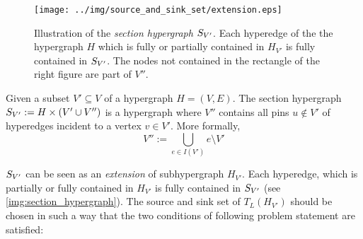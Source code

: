 \begin{figure}
\centering
\texttt{[image: ../img/source\_and\_sink\_set/extension.eps]}
\caption{Illustration of the \emph{section hypergraph} $S_{V'}$. Each hyperedge of the
         the hypergraph $H$ which is fully or partially contained in $H_{V'}$ is fully
         contained in $S_{V'}$. The nodes not contained in the rectangle of the right figure
         are part of $V''$.}
\label{img:section_hypergraph}
\end{figure}

\begin{definition}
\label{def:sub_extension}
Given a subset $V' \subseteq V$ of a hypergraph $H = (V,E)$.
The section hypergraph $S_{V'} := H \times (V' \cup V'')$ is a hypergraph
where $V''$ contains all pins $u \notin V'$ of hyperedges incident to a vertex 
$v \in V'$. More formally, 
\[V'' := \bigcup_{e \in I(V')} e \setminus V'\]
\end{definition}

$S_{V'}$ can be seen as an \emph{extension} of subhypergraph $H_{V'}$. Each
hyperedge, which is partially or fully contained in $H_{V'}$ is fully contained in $S_{V'}$
(see \autoref{img:section_hypergraph}). The source and sink set of $T_L(H_{V'})$ should be
chosen in such a way that the two conditions of following problem statement are satisfied:

